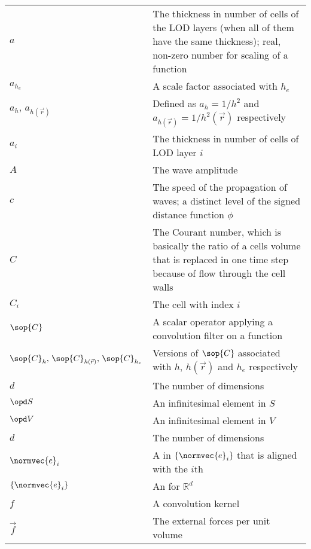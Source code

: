 \begin{center}
\begin{longtabu}{l X}
    $a$                 & The thickness in number of cells of the LOD layers
                          (when all of them have the same thickness);
                          real, non-zero number for scaling of a function \\
    $a_{h_e}$           & A scale factor associated with $h_e$ \\
    $a_h,\,a_{h(\vec{r})}$      & Defined as $a_h = 1/h^2$ and $a_{h(\vec{r})} = 1/h^2(\vec{r})$
                                  respectively \\
    $a_i$               & The thickness in number of cells of LOD layer $i$ \\
    $A$                 & The wave amplitude \\
    $c$                 & The speed of the propagation of waves;
                          a distinct level of the signed distance function $\phi$ \\
    $C$                 & The Courant number, which is basically the ratio of a cells volume that
                          is replaced in one time step because of flow through the cell walls \\
    $C_i$               & The cell with index $i$ \\
    $\sop{C}$           & A scalar operator applying a convolution filter on a function \\
    $\sop{C}_h,\,\sop{C}_{h(\vec{r})},\,\sop{C}_{h_e}$ & Versions of $\sop{C}$ associated with $h$,
                                                         $h(\vec{r})$ and $h_e$ respectively \\
    $d$                 & The number of dimensions \\
    $\opd S$            & An infinitesimal element in $S$ \\
    $\opd V$            & An infinitesimal element in $V$ \\
    $d$                 & The number of dimensions \\
    $\normvec{e}_i$     & A  in $\{\normvec{e}_i\}$ that is aligned
                          with the $i$th  \\
    $\{\normvec{e}_i\}$ & An  for $\mathbb{R}^d$ \\
    $f$                 & A convolution kernel \\
    $\vec{f}$           & The external forces per unit volume \\

\end{longtabu}
\end{center}
